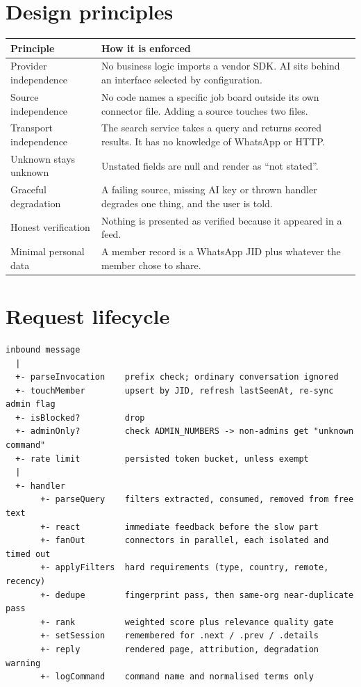 \documentclass[11pt,a4paper]{report}
\begin{document}
\section{Design principles}

\begin{center}
\begin{tabularx}{\textwidth}{@{}lX@{}}
\toprule
\textbf{Principle} & \textbf{How it is enforced} \\
\midrule
Provider independence & No business logic imports a vendor SDK. AI sits behind
an interface selected by configuration. \\
Source independence & No code names a specific job board outside its own
connector file. Adding a source touches two files. \\
Transport independence & The search service takes a query and returns scored
results. It has no knowledge of WhatsApp or HTTP. \\
Unknown stays unknown & Unstated fields are null and render as ``not stated''. \\
Graceful degradation & A failing source, missing AI key or thrown handler
degrades one thing, and the user is told. \\
Honest verification & Nothing is presented as verified because it appeared in a
feed. \\
Minimal personal data & A member record is a WhatsApp JID plus whatever the
member chose to share. \\
\bottomrule
\end{tabularx}
\end{center}

\section{Request lifecycle}

\begin{lstlisting}
inbound message
  |
  +- parseInvocation    prefix check; ordinary conversation ignored
  +- touchMember        upsert by JID, refresh lastSeenAt, re-sync admin flag
  +- isBlocked?         drop
  +- adminOnly?         check ADMIN_NUMBERS -> non-admins get "unknown command"
  +- rate limit         persisted token bucket, unless exempt
  |
  +- handler
       +- parseQuery    filters extracted, consumed, removed from free text
       +- react         immediate feedback before the slow part
       +- fanOut        connectors in parallel, each isolated and timed out
       +- applyFilters  hard requirements (type, country, remote, recency)
       +- dedupe        fingerprint pass, then same-org near-duplicate pass
       +- rank          weighted score plus relevance quality gate
       +- setSession    remembered for .next / .prev / .details
       +- reply         rendered page, attribution, degradation warning
       +- logCommand    command name and normalised terms only
\end{lstlisting}
\end{document}
